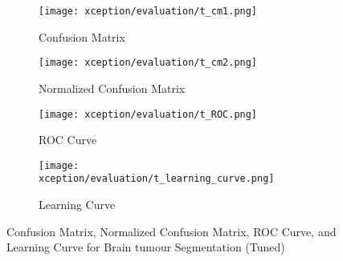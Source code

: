   \begin{figure}[H]
    \centering
    \begin{subfigure}[b]{0.2\textwidth}
      \centering
      \texttt{[image: xception/evaluation/t\_cm1.png]}
      \caption{Confusion Matrix}
      \label{fig:xception_t_cm1}
    \end{subfigure}
    \hfill
    \begin{subfigure}[b]{0.2\textwidth}
      \centering
      \texttt{[image: xception/evaluation/t\_cm2.png]}
      \caption{Normalized Confusion Matrix}
      \label{fig:xception_t_cm2}
    \end{subfigure}
    \hfill
    \begin{subfigure}[b]{0.25\textwidth}
      \centering
      \texttt{[image: xception/evaluation/t\_ROC.png]}
      \caption{ROC Curve}
      \label{fig:xception_t_roc}
    \end{subfigure}
    \hfill
    \begin{subfigure}[b]{0.25\textwidth}
      \centering
      \texttt{[image: xception/evaluation/t\_learning\_curve.png]}
      \caption{Learning Curve}
      \label{fig:xception_t_learning_curve}
    \end{subfigure}
    \caption{Confusion Matrix, Normalized Confusion Matrix, ROC Curve, and Learning Curve for Brain tumour Segmentation (Tuned)}
    \label{fig:xception_t_evaluation}
  \end{figure}
  
